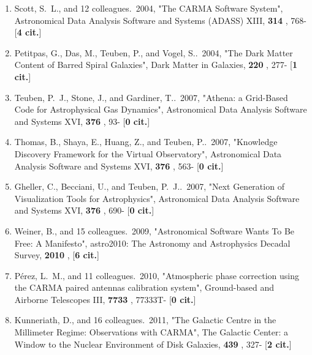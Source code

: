 \documentclass[11pt,letterpaper]{article}
\begin{document}
\begin{enumerate}[resume,label=\textbf{\arabic*}.]
\item  
Scott, S.~L., and 12 colleagues.\  2004,  "The CARMA Software System", 
Astronomical Data Analysis Software and Systems (ADASS) XIII,  {\bf 314} , 
768- [{\bf 4 cit.}] 

\item  
Petitpas, G., Das, M., Teuben, P., and Vogel, S..\  2004,  "The Dark Matter 
Content of Barred Spiral Galaxies", Dark Matter in Galaxies,  {\bf 220} , 
277- [{\bf 1 cit.}] 


\item  
Teuben, P.~J., Stone, J., and Gardiner, T..\  2007,  "Athena: a Grid-Based 
Code for Astrophysical Gas Dynamics", Astronomical Data Analysis Software 
and Systems XVI,  {\bf 376} , 93- [{\bf 0 cit.}] 

\item  
Thomas, B., Shaya, E., Huang, Z., and Teuben, P..\  2007,  "Knowledge 
Discovery Framework for the Virtual Observatory", Astronomical Data 
Analysis Software and Systems XVI,  {\bf 376} , 563- [{\bf 0 cit.}] 

\item  
Gheller, C., Becciani, U., and Teuben, P.~J..\  2007,  "Next Generation of 
Visualization Tools for Astrophysics", Astronomical Data Analysis Software 
and Systems XVI,  {\bf 376} , 690- [{\bf 0 cit.}] 

\item  
Weiner, B., and 15 colleagues.\  2009,  "Astronomical Software Wants To Be 
Free: A Manifesto", astro2010: The Astronomy and Astrophysics Decadal 
Survey,  {\bf 2010} ,  [{\bf 6 cit.}] 


\item  
P{\'e}rez, L.~M., and 11 colleagues.\  2010,  "Atmospheric phase correction 
using the CARMA paired antennas calibration system", Ground-based and 
Airborne Telescopes III,  {\bf 7733} , 77333T- [{\bf 0 cit.}] 





\item  
Kunneriath, D., and 16 colleagues.\  2011,  "The Galactic Centre in the 
Millimeter Regime: Observations with CARMA", The Galactic Center: a Window 
to the Nuclear Environment of Disk Galaxies,  {\bf 439} , 327- [{\bf 2 
cit.}] 



\end{enumerate}
\end{document}
